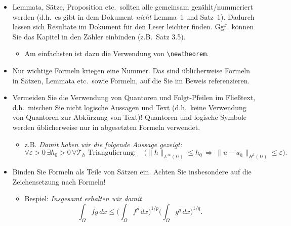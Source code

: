 \documentclass[../main.tex]{subfiles}
\begin{document}
\begin{itemize}
  \item Lemmata, Sätze, Proposition etc.\ sollten alle gemeinsam gezählt/nummeriert werden (d.h.\ es gibt in dem Dokument \emph{nicht} Lemma~1 und Satz~1). Dadurch lassen sich Resultate im Dokument für den Leser leichter finden. Ggf.\ können Sie das Kapitel in den Zähler einbinden (z.B.\ Satz 3.5).
        \begin{itemize}
          \item Am einfachsten ist dazu die Verwendung von \verb$\newtheorem$.
        \end{itemize}

  \item Nur wichtige Formeln kriegen eine Nummer. Das sind üblicherweise Formeln in Sät\-zen, Lemmata etc.\ sowie Formeln, auf die Sie im Beweis referenzieren.

  \item Vermeiden Sie die Verwendung von Quantoren und Folgt-Pfeilen im Fließtext, d.h.\ mischen Sie nicht logische Aussagen und Text (d.h.\ keine Verwendung von Quantoren zur Abkürzung von Text)! Quantoren und logische Symbole werden üblicherweise nur in abgesetzten Formeln verwendet.
        \begin{itemize}
          \item z.B. \emph{Damit haben wir die folgende Aussage gezeigt:
                  \begin{equation*}
                    \forall \varepsilon > 0 \, \exists h_0 > 0 \, \forall \mathcal{T}_h\text{ Triangulierung}:
                    \quad \Big( \| h \|_{L^\infty(\Omega)} \le h_0
                    \, \Longrightarrow \,
                    \| u - u_h \|_{H^1(\Omega)} \le \varepsilon \Big).
                  \end{equation*}}
        \end{itemize}

  \item Binden Sie Formeln als Teile von Sätzen ein. Achten Sie insbesondere auf die Zeichensetzung nach Formeln!
        \begin{itemize}
          \item Bespiel: \emph{Insgesamt erhalten wir damit
                  \begin{equation}\label{eq:hoelder}
                    \int_\Omega fg\,dx
                    \le \bigg(\int_\Omega f^p \, dx\bigg)^{1/p} \bigg(\int_\Omega g^q \, dx\bigg)^{1/q}.
                  \end{equation}}
        \end{itemize}


\end{itemize}
\end{document}

